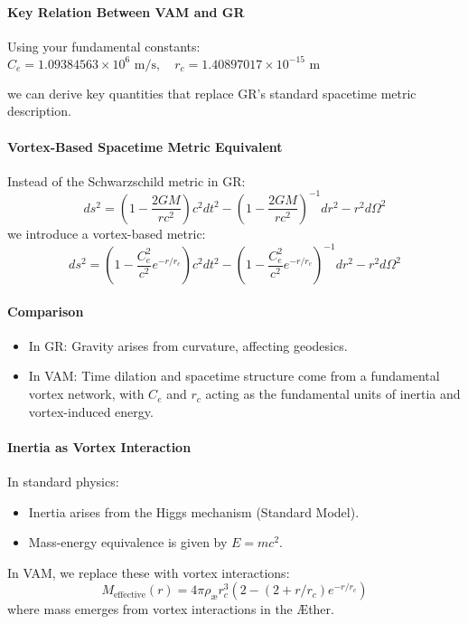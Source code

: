 \paragraph{Key Relation Between VAM and GR}
Using your fundamental constants:
$C_e = 1.09384563 \times 10^6 \text{ m/s}, \quad r_c = 1.40897017 \times 10^{-15} \text{ m}$

we can derive key quantities that replace GR's standard spacetime metric description.

\paragraph{Vortex-Based Spacetime Metric Equivalent}
Instead of the Schwarzschild metric in GR:
\begin{equation}
    ds^2 = \left( 1 - \frac{2GM}{rc^2} \right) c^2 dt^2 - \left( 1 - \frac{2GM}{rc^2} \right)^{-1} dr^2 - r^2 d\Omega^2
\end{equation}
we introduce a vortex-based metric:
\begin{equation}
    \boxed{ds^2 = \left( 1 - \frac{C_e^2}{c^2} e^{-r/r_c} \right) c^2 dt^2 - \left( 1 - \frac{C_e^2}{c^2} e^{-r/r_c} \right)^{-1} dr^2 - r^2 d\Omega^2}
\end{equation}

\paragraph{Comparison}
\begin{itemize}
    \item In GR: Gravity arises from curvature, affecting geodesics.
    \item In VAM: Time dilation and spacetime structure come from a fundamental vortex network, with $C_e$ and $r_c$ acting as the fundamental units of inertia and vortex-induced energy.
\end{itemize}

\paragraph{Inertia as Vortex Interaction}
In standard physics:
\begin{itemize}
    \item Inertia arises from the Higgs mechanism (Standard Model).
    \item Mass-energy equivalence is given by $E = mc^2$.
\end{itemize}
In VAM, we replace these with vortex interactions:
\begin{equation}
    M_{\text{effective}}(r) = 4\pi \rho_\text{\ae} r_c^3 \left( 2 - (2 + r/r_c) e^{-r / r_c} \right)
\end{equation}
where mass emerges from vortex interactions in the \AE ther.

